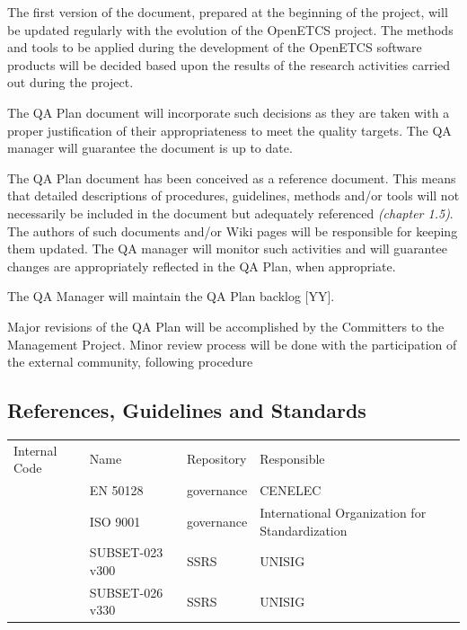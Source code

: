 \documentclass{template/openetcs_article}
\begin{document}




The first version of the document, prepared at the beginning of the project, will be updated regularly with the evolution of the OpenETCS project. The methods and tools to be applied during the development of the OpenETCS software products will be decided based upon the results of the research activities carried out during the project. 

The QA Plan document will incorporate such decisions as they are taken with a proper justification of their appropriateness to meet the quality targets. The QA manager will guarantee the document is up to date.  

The QA Plan document has been conceived as a reference document. This means that detailed descriptions of procedures, guidelines, methods and/or tools will not necessarily be included in the document but adequately referenced \textit{(chapter 1.5)}. The authors of such documents and/or Wiki pages will be responsible for keeping them updated. The QA manager will monitor such activities and will guarantee changes are appropriately reflected in the QA Plan, when appropriate.

The QA Manager will maintain the QA Plan backlog [YY].

Major revisions of the QA Plan will be accomplished by the Committers to the Management Project. Minor review process will be done with the participation of the external community, following procedure \citep{RP}


\subsection{References, Guidelines and Standards}

\begin{flushleft}
\begin{tabular}[H]{|m{2cm}|m{7cm}|m{2cm}|m{3cm}|}
\hline
\rowcolor{myblue}
\multicolumn{4}{|c|}{Standards} \\\hline
\rowcolor{lightgray}
Internal Code &
Name &
Repository &
Responsible 
\\\hline
\citep{EN50128} &
EN 50128 &
governance &
CENELEC\\\hline
\cite{ISO9001} &
ISO 9001 &
governance &
International Organization for Standardization\\\hline
\cite{subset023} &
SUBSET-023 v300 &
SSRS &
UNISIG\\\hline
\cite{subset026} &
SUBSET-026 v330 &
SSRS &
UNISIG\\\hline
\end{tabular}
\end{flushleft}
\end{document}
